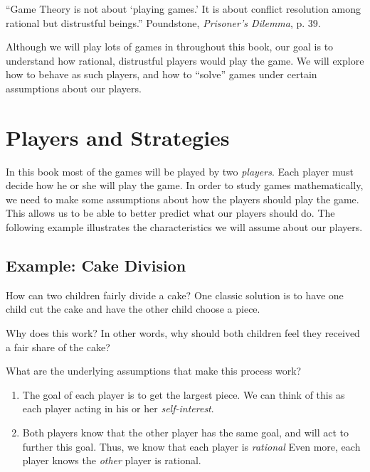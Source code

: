 \vspace{.2in}
``Game Theory is not about `playing games.' It is about conflict resolution among rational but distrustful beings.'' Poundstone, {\it Prisoner's Dilemma}, p. 39.

Although we will play lots of games in throughout this book, our goal is to understand how rational, distrustful players would play the game. We will explore how to behave as such players, and how to ``solve'' games under certain assumptions about our players.

\vspace{.1in}

\section{Players and Strategies}\label{S:intro}

In this book most of the games will be played by two \emph{players}. Each player must decide how he or she will play the game. In order to study games mathematically, we need to make some assumptions about how the players should play the game. This allows us to be able to better predict what our players should do. The following example illustrates the characteristics we will assume about our players.


\subsection{Example: Cake Division}\label{Ex:Cake}



How can two children fairly divide a cake? One classic solution is to have one child cut the cake and have the other child choose a piece.

Why does this work? In other words, why should both children feel they received a fair share of the cake?

What are the underlying assumptions that make this process work?
\begin{enumerate}
\item The goal of each player is to get the largest piece. We can think of this as each player acting in his or her \emph{self-interest}.
\item Both players know that the other player has the same goal, and will act to further this goal. Thus, we know that each player is \emph{rational} Even more, each player knows the \emph{other} player is rational.
\end{enumerate}

